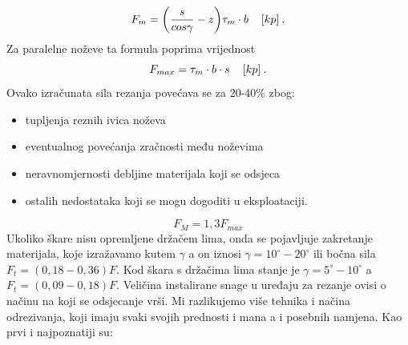 \documentclass[a4paper,12pt]{article}
\numberwithin{figure}{section}
\begin{document}
\begin{equation*}
F_{m} = \bigg(\frac{s}{cos\gamma} - z\bigg)\tau_{m}\cdot b\hspace{0.4cm}[kp]\:.
\end{equation*}
Za paralelne noževe ta formula poprima vrijednost
\begin{equation*}
F_{max} = \tau_{m}\cdot b \cdot s\hspace{0.4cm}[kp]\:.
\end{equation*}
Ovako izračunata sila rezanja povećava se za 20-40\% zbog:
\begin{itemize}
\item tupljenja reznih ivica noževa
\item eventualnog povećanja zračnosti među noževima
\item neravnomjernosti debljine materijala koji se odsjeca
\item ostalih nedostataka koji se mogu dogoditi u eksploataciji.
\end{itemize}
\begin{equation*}
F_{M} = 1,3 F_{max}
\end{equation*}
Ukoliko škare nisu opremljene držačem lima, onda se pojavljuje zakretanje materijala, koje izražavamo kutem $\gamma$ a on iznosi $\gamma = 10^{\circ} - 20^{\circ}$ ili bočna sila $F_{t} = (0,18 - 0,36)F$. Kod škara s držačima lima stanje je $\gamma = 5^{\circ}-10^{\circ}$ a $F_{t} = (0,09 - 0,18)F$. Veličina instalirane snage u uređaju za rezanje ovisi o načinu na koji se odsjecanje vrši. Mi razlikujemo više tehnika i načina odrezivanja, koji imaju svaki svojih prednosti i mana a i posebnih namjena. Kao prvi i najpoznatiji su:
\clearpage
\end{document}
